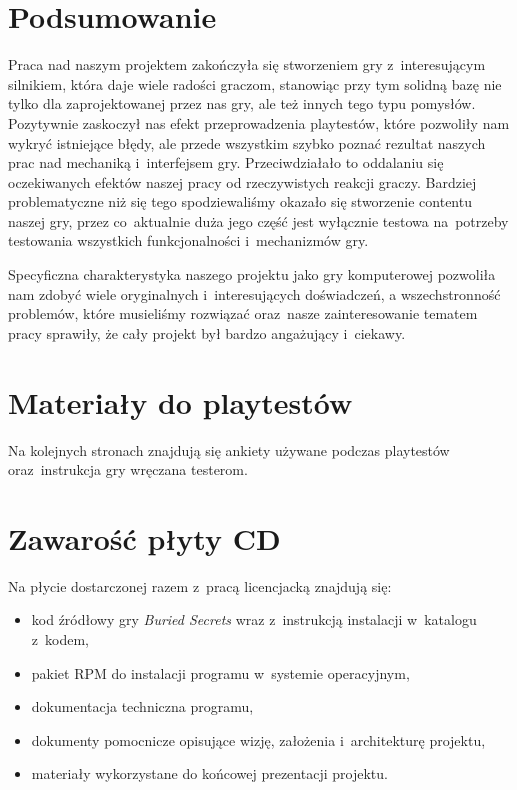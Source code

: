 \documentclass[licencjacka]{pracamgr}
\begin{document}
\chapter{Podsumowanie}
  Praca nad naszym projektem zakończyła się stworzeniem gry z~interesującym silnikiem, która daje wiele radości graczom,
  stanowiąc przy tym solidną bazę nie tylko dla zaprojektowanej przez nas gry, ale też innych tego typu pomysłów.
  Pozytywnie zaskoczył nas efekt przeprowadzenia playtestów, które pozwoliły nam wykryć istniejące błędy, 
  ale przede wszystkim szybko poznać rezultat naszych prac nad mechaniką i~interfejsem gry. Przeciwdziałało to oddalaniu
  się oczekiwanych efektów naszej pracy od rzeczywistych reakcji graczy. Bardziej problematyczne niż się tego
  spodziewaliśmy okazało się stworzenie contentu naszej gry, przez co~aktualnie duża jego część jest wyłącznie testowa
  na~potrzeby testowania wszystkich funkcjonalności i~mechanizmów gry. 

  Specyficzna charakterystyka naszego projektu jako gry komputerowej pozwoliła nam zdobyć wiele oryginalnych i~interesujących
  doświadczeń, a wszechstronność problemów, które musieliśmy rozwiązać oraz~nasze zainteresowanie tematem pracy sprawiły,
  że cały projekt był bardzo angażujący i~ciekawy.


\appendix

\chapter{Materiały do playtestów}
  Na kolejnych stronach znajdują się ankiety używane podczas playtestów
  oraz~instrukcja gry wręczana testerom.

   
   
   

\chapter{Zawarość płyty CD}
  Na płycie dostarczonej razem z~pracą licencjacką znajdują się:
  \begin{itemize}
   \item kod źródłowy gry \emph{Buried Secrets} wraz z~instrukcją instalacji w~katalogu z~kodem,
   \item pakiet RPM do instalacji programu w~systemie operacyjnym,
   \item dokumentacja techniczna programu,
   \item dokumenty pomocnicze opisujące wizję, założenia i~architekturę projektu,
   \item materiały wykorzystane do końcowej prezentacji projektu.
  \end{itemize}
\end{document}
